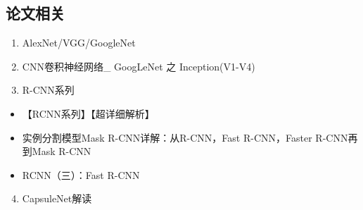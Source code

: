 \documentclass[letterpaper,10pt,english]{sphinxmanual}
\begin{document}
\subsection{论文相关}
\label{\detokenize{else/02_interview:id5}}\begin{enumerate}
\item {} 
AlexNet/VGG/GoogleNet

\end{enumerate}
\begin{quote}

\end{quote}
\begin{enumerate}
\setcounter{enumi}{1}
\item {} 
CNN卷积神经网络\_ GoogLeNet 之 Inception(V1-V4)

\end{enumerate}
\begin{quote}

\end{quote}
\begin{enumerate}
\setcounter{enumi}{2}
\item {} 
R-CNN系列

\end{enumerate}
\begin{itemize}
\item {} 
【RCNN系列】【超详细解析】
\begin{quote}

\end{quote}

\item {} 
实例分割模型Mask R-CNN详解：从R-CNN，Fast R-CNN，Faster R-CNN再到Mask R-CNN
\begin{quote}

\end{quote}

\item {} 
RCNN（三）：Fast R-CNN
\begin{quote}

\end{quote}

\end{itemize}
\begin{enumerate}
\setcounter{enumi}{3}
\item {} 
CapsuleNet解读

\end{enumerate}
\begin{quote}

\end{quote}
\end{document}
